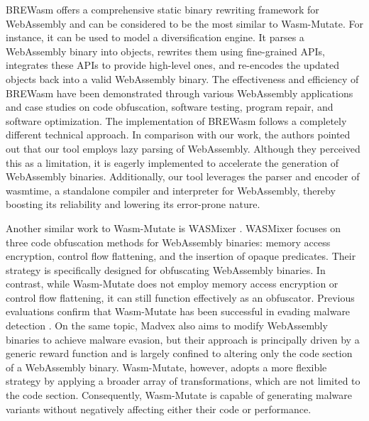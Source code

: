 \documentclass[a4paper,fleqn]{cas-dc}
\newcommand*\badge[1]{ \colorbox{red}{\color{white}#1}}
\newcommand{\tool}{{\sc Wasm-Mutate}\xspace}
\newcommand{\Wasm}{WebAssembly\xspace}
\newcommand{\wasm}{\Wasm}
\newcommand{\todo}[1]{%
\refstepcounter{todo}
\noindent\textbf{\badge{TODO}} {\color{red}#1}
\addcontentsline{td}{todo}
{\color{red}\thesection.\thetodo\xspace #1}}
\begin{document}

BREWasm \cite{rewritingtool2023} offers a comprehensive static binary rewriting framework for \Wasm and can be considered to be the most similar to \tool. 
For instance, it can be used to model a diversification engine.
It parses a WebAssembly binary into objects, rewrites them using fine-grained APIs, integrates these APIs to provide high-level ones, and re-encodes the updated objects back into a valid WebAssembly binary. 
The effectiveness and efficiency of BREWasm have been demonstrated through various WebAssembly applications and case studies on code obfuscation, software testing, program repair, and software optimization. 
The implementation of BREWasm follows a completely different technical approach.
In comparison with our work, the authors pointed out that our tool employs lazy parsing of WebAssembly. 
Although they perceived this as a limitation, it is eagerly implemented to accelerate the generation of \wasm binaries.
Additionally, our tool leverages the parser and encoder of wasmtime, a standalone compiler and interpreter for WebAssembly, thereby boosting its reliability and lowering its error-prone nature.

Another similar work to \tool is WASMixer \cite{wasmixer}.
WASMixer focuses on three code obfuscation methods for WebAssembly  binaries: memory access encryption, control flow flattening, and the insertion of opaque predicates. 
Their strategy is specifically designed for obfuscating WebAssembly binaries. 
In contrast, while \tool does not employ memory access encryption or control flow flattening, it can still function effectively as an obfuscator. 
Previous evaluations confirm that \tool has been successful in evading malware detection \cite{CABRERAARTEAGA2023103296}.
On the same topic, Madvex \cite{madvex} also aims to modify WebAssembly binaries to achieve malware evasion, but their approach is principally driven by a generic reward function and is largely confined to altering only the code section of a WebAssembly binary. 
\tool, however, adopts a more flexible strategy by applying a broader array of transformations, which are not limited to the code section. 
Consequently, \tool is capable of generating malware variants without negatively affecting either their code or performance.
\end{document}
